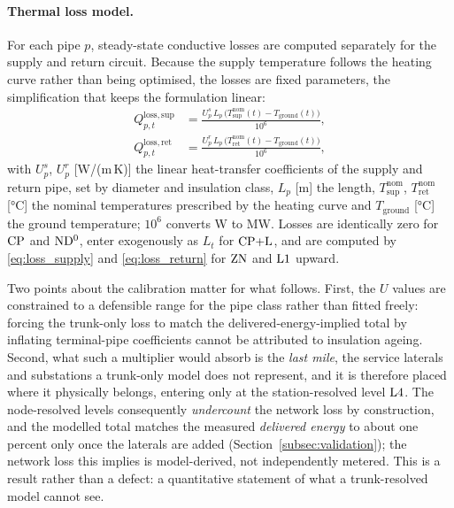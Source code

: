 \paragraph{Thermal loss model.}
For each pipe $p$, steady-state conductive losses are computed separately for the supply
and return circuit. Because the supply temperature follows the heating curve rather than
being optimised, the losses are fixed parameters, the simplification that keeps the
formulation linear:
%
\begin{align}
  Q_{p,t}^{\mathrm{loss,sup}} &= \frac{U^{s}_p\, L_p\,
    \bigl(T_{\mathrm{sup}}^{\mathrm{nom}}(t)
    - T_{\mathrm{ground}}(t)\bigr)}{10^6},
  \label{eq:loss_supply} \\[4pt]
  Q_{p,t}^{\mathrm{loss,ret}} &= \frac{U^{r}_p\, L_p\,
    \bigl(T_{\mathrm{ret}}^{\mathrm{nom}}(t)
    - T_{\mathrm{ground}}(t)\bigr)}{10^6},
  \label{eq:loss_return}
\end{align}
%
with $U^{s}_p$, $U^{r}_p$ [W/(m\,K)] the linear heat-transfer coefficients of the supply
and return pipe, set by diameter and insulation class, $L_p$ [m] the length,
$T_{\mathrm{sup}}^{\mathrm{nom}}$, $T_{\mathrm{ret}}^{\mathrm{nom}}$ [°C] the nominal
temperatures prescribed by the heating curve and $T_{\mathrm{ground}}$ [°C] the ground
temperature; $10^6$ converts W to MW. Losses are identically zero for $\mathrm{CP}$ and $\mathrm{ND^{0}}$,
enter exogenously as $L_t$ for $\mathrm{CP{+}L}$, and are computed by \eqref{eq:loss_supply} and
\eqref{eq:loss_return} for $\mathrm{ZN}$ and $\mathrm{L1}$ upward.

Two points about the calibration matter for what follows. First, the $U$ values are
constrained to a defensible range for the pipe class rather than fitted freely: forcing the
trunk-only loss to match the delivered-energy-implied total by inflating terminal-pipe
coefficients cannot be attributed to insulation ageing. Second, what such a multiplier would absorb is the
\emph{last mile}, the service laterals and substations a trunk-only model does not represent,
and it is therefore placed where it physically belongs, entering only at the station-resolved
level $\mathrm{L4}$. The node-resolved levels consequently \emph{undercount} the network
loss by construction, and the modelled total matches the measured \emph{delivered energy} to
about one percent only once the laterals are added (Section~\ref{subsec:validation}); the
network loss this implies is model-derived, not independently metered. This is a result rather
than a defect: a quantitative statement of what a trunk-resolved model cannot see.

